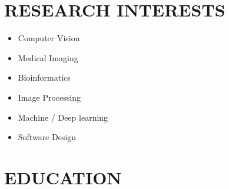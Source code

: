 \documentclass[10pt,a4paper,sans]{moderncv} %
\begin{document}
	
	\makecvtitle
	
	\section{RESEARCH INTERESTS}
	\begin{itemize}
		\item Computer Vision
		\item Medical Imaging
		\item Bioinformatics
		\item Image Processing
		\item Machine / Deep learning
		\item Software Design
	\end{itemize}
	
	\section{EDUCATION}
	
\end{document}
